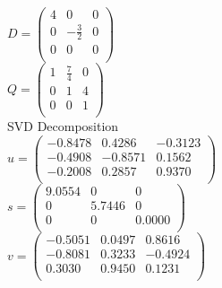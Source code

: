 \documentclass{article}
\begin{document}
$D = 
\begin{pmatrix}
    4 & 0 & 0 \\
    0 & -\frac{3}{2} & 0 \\
    0 & 0 & 0 \\
\end{pmatrix}
$ \\
$
Q = 
\begin{pmatrix}
    1 & \frac{7}{4} & 0 \\
    0 & 1 & 4 \\
    0 & 0 & 1 \\
\end{pmatrix}
$ \\
SVD Decomposition\\
$
u =
\begin{pmatrix}
   -0.8478  &  0.4286 &  -0.3123 \\
   -0.4908  & -0.8571 &   0.1562 \\
   -0.2008  &  0.2857 &   0.9370 \\
\end{pmatrix}$\\

$s =
\begin{pmatrix}
    9.0554    &     0     &    0\\
         0   & 5.7446    &     0\\
         0     &    0  &  0.0000\\

\end{pmatrix}$\\

$v =
\begin{pmatrix}
   -0.5051   & 0.0497  &  0.8616 \\
   -0.8081   & 0.3233  & -0.4924 \\
    0.3030   & 0.9450  &  0.1231 \\
\end{pmatrix}$
\end{document}
